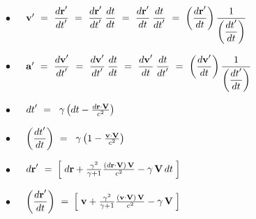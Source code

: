 \documentclass[10pt,fleqn]{article}
\begin{document}
\newpage

\noindent $\bullet$
$
\hspace{+1.20em} {\mathbf{v}}' ~=~ \dfrac{{d\mathbf{r}}'}{{dt}'} ~=~ \dfrac{{d\mathbf{r}}'}{{dt}'} \: \dfrac{dt}{dt} ~=~ \dfrac{{d\mathbf{r}}'}{dt} \: \dfrac{dt}{{dt}'} ~=~ \left ( \dfrac{{d\mathbf{r}}'}{dt} \right ) \dfrac{1}{\left ( \dfrac{{dt}'}{dt} \right )}
$

\par \vspace{+2.07em}

\noindent $\bullet$
$
\hspace{+1.20em} {\mathbf{a}}' ~=~ \dfrac{{d\mathbf{v}}'}{{dt}'} ~=~ \dfrac{{d\mathbf{v}}'}{{dt}'} \: \dfrac{dt}{dt} ~=~ \dfrac{{d\mathbf{v}}'}{dt} \: \dfrac{dt}{{dt}'} ~=~ \left ( \dfrac{{d\mathbf{v}}'}{dt} \right ) \dfrac{1}{\left ( \dfrac{{dt}'}{dt} \right )}
$

\par \vspace{+2.07em}

\noindent $\bullet$
$
\hspace{+1.20em} {dt}' ~=~ \hspace{+0.24em} \gamma \left ( dt - \frac{d\mathbf{r} \cdot \mathbf{V}}{c^2} \right )
$

\par \vspace{+2.07em}

\noindent $\bullet$
$
\hspace{+1.20em} \left ( \dfrac{{dt}'}{dt} \right ) ~=~ \hspace{+0.24em} \gamma \left ( 1 - \frac{\mathbf{v} \cdot \mathbf{V}}{c^2} \right )
$

\par \vspace{+2.07em}

\noindent $\bullet$
$
\hspace{+1.20em} {d\mathbf{r}}' ~=~ \hspace{-0.09em} \left [ \; d\mathbf{r} + \frac{\gamma^2}{\gamma + 1} \frac{( d\mathbf{r} \cdot \mathbf{V} ) \, \mathbf{V}}{c^2} - \gamma \, \mathbf{V} \, dt \; \right ]
$

\par \vspace{+2.07em}

\noindent $\bullet$
$
\hspace{+1.20em} \left ( \dfrac{{d\mathbf{r}}'}{dt} \right ) ~=~ \hspace{-0.09em} \left [ \; \mathbf{v} + \frac{\gamma^2}{\gamma + 1} \frac{( \mathbf{v} \cdot \mathbf{V} ) \, \mathbf{V}}{c^2} - \gamma \, \mathbf{V} \; \right ]
$
\end{document}
